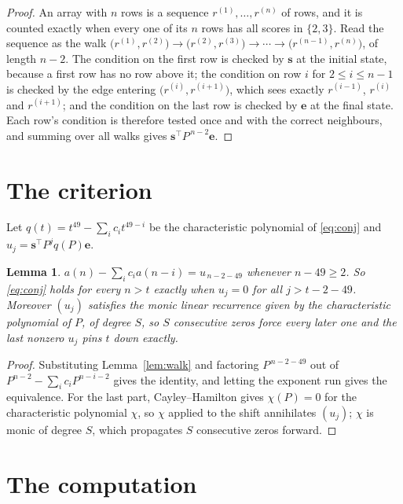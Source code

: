 \documentclass[11pt,a4paper]{article}
\theoremstyle{plain}
\newtheorem{lemma}[theorem]{Lemma}
\theoremstyle{definition}
\begin{document}
\begin{proof}
An array with $n$ rows is a sequence $r^{(1)},\dots,r^{(n)}$ of rows, and it is counted
exactly when every one of its $n$ rows has all scores in $\{2,3\}$. Read the sequence as the
walk $\bigl(r^{(1)},r^{(2)}\bigr)\to\bigl(r^{(2)},r^{(3)}\bigr)\to\cdots\to
\bigl(r^{(n-1)},r^{(n)}\bigr)$, of length $n-2$. The condition on the first row is
checked by $\mathbf{s}$ at the initial state, because a first row has no row above it; the
condition on row $i$ for $2\le i\le n-1$ is checked by the edge entering
$\bigl(r^{(i)},r^{(i+1)}\bigr)$, which sees exactly $r^{(i-1)}$, $r^{(i)}$ and
$r^{(i+1)}$; and the condition on the last row is checked by $\mathbf{e}$ at the final
state. Each row's condition is therefore tested once and with the correct neighbours, and
summing over all walks gives $\mathbf{s}^{\!\top}P^{\,n-2}\mathbf{e}$.
\end{proof}

\section{The criterion}

Let $q(t)=t^{49}-\sum_i c_i t^{49-i}$ be the characteristic polynomial of
\eqref{eq:conj} and $u_j=\mathbf{s}^{\!\top}P^{j}q(P)\mathbf{e}$.

\begin{lemma}\label{lem:crit}
$a(n)-\sum_i c_i a(n-i)=u_{\,n-2-49}$ whenever $n-49\ge2$. So \eqref{eq:conj}
holds for every $n>t$ exactly when $u_j=0$ for all $j>t-2-49$. Moreover $(u_j)$
satisfies the monic linear recurrence given by the characteristic polynomial of $P$, of
degree $S$, so $S$ consecutive zeros force every later one and the last nonzero $u_j$ pins
$t$ down exactly.
\end{lemma}

\begin{proof}
Substituting Lemma~\ref{lem:walk} and factoring $P^{\,n-2-49}$ out of
$P^{n-2}-\sum_i c_i P^{n-i-2}$ gives the identity, and letting the exponent run gives the
equivalence. For the last part, Cayley--Hamilton gives $\chi(P)=0$ for the characteristic
polynomial $\chi$, so $\chi$ applied to the shift annihilates $(u_j)$; $\chi$ is monic of
degree $S$, which propagates $S$ consecutive zeros forward.
\end{proof}

\section{The computation}
\end{document}
